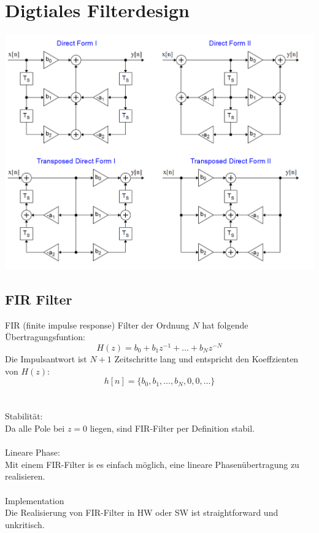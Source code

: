



\chapter{Digtiales Filterdesign}
\begin{center}
	\includegraphics[scale=.8]{../fig/lti_scheme}
\end{center}
\section{FIR Filter}
FIR (finite impulse response) Filter der Ordnung $N$ hat folgende
Übertragungsfuntion:
\[ H(z) =b_0 + b_1z^{-1} + \ldots + b_Nz^{-N} \]
Die Impulsantwort ist $N+1$ Zeitschritte lang und entspricht den Koeffzienten
von $H(z)$:
\[ h[n] = \{ b_0,b_1,\ldots,b_N,0,0,\ldots \} \]\\
\\
\textrm{Stabilität:}\\
Da alle Pole bei $z=0$ liegen, sind FIR-Filter per Definition stabil.\\
\\
\textrm{Lineare Phase:}\\
Mit einem FIR-Filter is es einfach möglich, eine lineare Phasenübertragung
zu realisieren.\\
\\
\textrm{Implementation}\\
Die Realisierung von FIR-Filter in HW oder SW ist straightforward und unkritisch.


